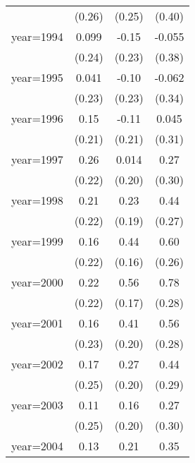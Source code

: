\begin{sidewaystable}[htbp]
\begin{tabular}{l*{3}{c}}
                &   (0.26)         &   (0.25)         &   (0.40)         \\
\addlinespace
year=1994       &    0.099         &    -0.15         &   -0.055         \\
                &   (0.24)         &   (0.23)         &   (0.38)         \\
\addlinespace
year=1995       &    0.041         &    -0.10         &   -0.062         \\
                &   (0.23)         &   (0.23)         &   (0.34)         \\
\addlinespace
year=1996       &     0.15         &    -0.11         &    0.045         \\
                &   (0.21)         &   (0.21)         &   (0.31)         \\
\addlinespace
year=1997       &     0.26         &    0.014         &     0.27         \\
                &   (0.22)         &   (0.20)         &   (0.30)         \\
\addlinespace
year=1998       &     0.21         &     0.23         &     0.44         \\
                &   (0.22)         &   (0.19)         &   (0.27)         \\
\addlinespace
year=1999       &     0.16         &     0.44\sym{**} &     0.60\sym{**} \\
                &   (0.22)         &   (0.16)         &   (0.26)         \\
\addlinespace
year=2000       &     0.22         &     0.56\sym{***}&     0.78\sym{***}\\
                &   (0.22)         &   (0.17)         &   (0.28)         \\
\addlinespace
year=2001       &     0.16         &     0.41\sym{**} &     0.56\sym{*}  \\
                &   (0.23)         &   (0.20)         &   (0.28)         \\
\addlinespace
year=2002       &     0.17         &     0.27         &     0.44         \\
                &   (0.25)         &   (0.20)         &   (0.29)         \\
\addlinespace
year=2003       &     0.11         &     0.16         &     0.27         \\
                &   (0.25)         &   (0.20)         &   (0.30)         \\
\addlinespace
year=2004       &     0.13         &     0.21         &     0.35         \\

\end{tabular}
\end{sidewaystable}

